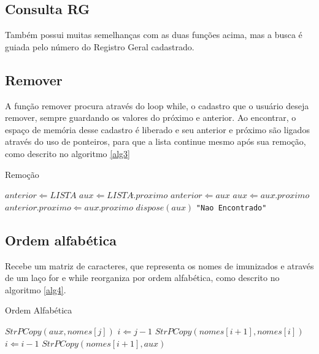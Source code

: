 \documentclass[12pt]{article}
\begin{document}
\subsection{Consulta RG}

Também possui muitas semelhanças com as duas funções acima, mas a busca é guiada pelo número
do Registro Geral cadastrado.

\subsection{Remover}

A função remover procura através do loop while, o cadastro que o usuário deseja remover, sempre
guardando os valores do próximo e anterior. Ao encontrar, o espaço de memória desse cadastro é
liberado e seu anterior e próximo são ligados através do uso de ponteiros, para que a lista continue
mesmo após sua remoção, como descrito no algoritmo \ref{alg3}

\begin{algorithm}                      %
\caption{Remoção}          %
\label{alg3}                           %
\begin{algorithmic}                    %
    \STATE $anterior \Leftarrow LISTA$
    \STATE $aux \Leftarrow LISTA\hat.proximo$
        \STATE $anterior \Leftarrow aux$
        \STATE $aux \Leftarrow aux\hat.proximo$
    \ENDWHILE
      \STATE $anterior\hat.proximo \Leftarrow aux\hat.proximo$
      \STATE $dispose(aux)$
    \ELSE
      \PRINT \texttt{"Nao Encontrado"}
    \ENDIF
\end{algorithmic}
\end{algorithm}  

\subsection{Ordem alfabética}
Recebe um matriz de caracteres, que representa os nomes de imunizados e através de um laço for e while reorganiza por ordem
alfabética, como descrito no algoritmo \ref{alg4}.


\begin{algorithm}                      %
\caption{Ordem Alfabética}          %
\label{alg4}                           %
\begin{algorithmic}                    %
      \STATE $StrPCopy(aux, nomes[j])$
      \STATE $i \Leftarrow j-1$
        \STATE $StrPCopy(nomes[i+1], nomes[i])$
        \STATE $i \Leftarrow i -1$
      \ENDWHILE
      \STATE $StrPCopy(nomes[i+1], aux)$
    \ENDFOR
\end{algorithmic}
\end{algorithm}
\end{document}
